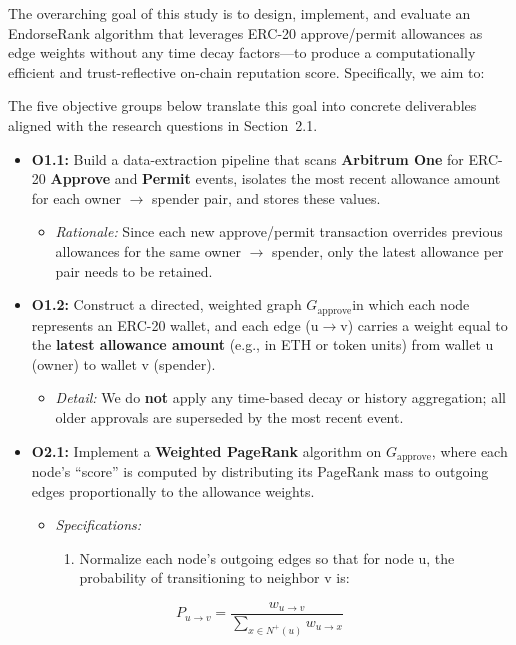 The overarching goal of this study is to design, implement, and evaluate an EndorseRank algorithm that leverages ERC-20 approve/permit allowances as edge weights without any time decay factors---to produce a computationally efficient and trust-reflective on-chain reputation score. Specifically, we aim to:


The five objective groups below translate this goal into concrete deliverables aligned with the research questions in Section~2.1.



\begin{itemize}
\item[\textbullet] \textbf{O1.1: }Build a data-extraction pipeline that scans \textbf{Arbitrum One} for ERC-20 \textbf{Approve }and \textbf{Permit }events, isolates the most recent allowance amount for each owner \(\to\) spender pair, and stores these values.
\begin{itemize}
\item[\textendash] \emph{Rationale: }Since each new approve/permit transaction overrides previous allowances for the same owner \(\to\) spender, only the latest allowance per pair needs to be retained.
\end{itemize}
\item[\textbullet] \textbf{O1.2: }Construct a directed, weighted graph $G_{\text{approve}}$in which each node represents an ERC-20 wallet, and each edge (u\(\to\)v) carries a weight equal to the \textbf{latest allowance amount }(e.g., in ETH or token units) from wallet u (owner) to wallet v (spender).
\begin{itemize}
\item[\textendash] \emph{Detail: }We do \textbf{not }apply any time-based decay or history aggregation; all older approvals are superseded by the most recent event.
\end{itemize}
\end{itemize}

\begin{itemize}
\item[\textbullet] \textbf{O2.1: }Implement a \textbf{Weighted PageRank }algorithm on $G_{\text{approve}}$, where each node's ``score'' is computed by distributing its PageRank mass to outgoing edges proportionally to the allowance weights.
\begin{itemize}
\item[\textendash] \emph{Specifications:}
\begin{enumerate}
\item[(a)] Normalize each node's outgoing edges so that for node u, the probability of transitioning to neighbor v is:
\end{enumerate}
\end{itemize}
\end{itemize}
\[P_{u\to v} = \frac{w_{u\to v}}{\sum _{x\in N^{+}(u)}w_{u\to x}}\]

